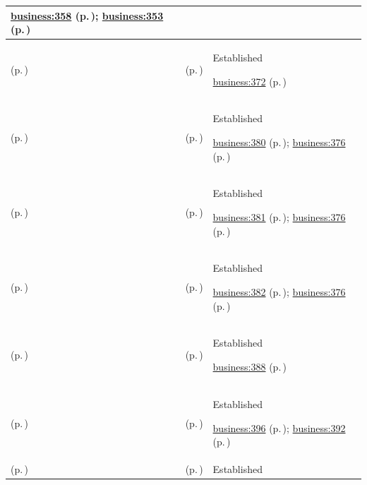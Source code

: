 \begin{longtable}{|>{\raggedright\arraybackslash}p{0.27\TableWidth}|>{\raggedright\arraybackslash}p{0.27\TableWidth}|>{\raggedright\arraybackslash}p{0.46\TableWidth}|}
 \hyperref[rad:business:355]{business:358} (p.\,\pageref{rad:business:355}); \hyperref[rad:business:353]{business:353} (p.\,\pageref{rad:business:353})\\\hline
\nameref{cap:bc-care-access-coordination} (p.\,\pageref{cap:bc-care-access-coordination}) & \nameref{cap:bc-care-access-management} (p.\,\pageref{cap:bc-care-access-management}) & Established

 \hyperref[rad:business:372]{business:372} (p.\,\pageref{rad:business:372})\\\hline
\nameref{cap:bc-care-access-management} (p.\,\pageref{cap:bc-care-access-management}) & \nameref{cap:bc-care-intake-management} (p.\,\pageref{cap:bc-care-intake-management}) & Established

 \hyperref[rad:business:378]{business:380} (p.\,\pageref{rad:business:378}); \hyperref[rad:business:376]{business:376} (p.\,\pageref{rad:business:376})\\\hline
\nameref{cap:bc-care-access-management} (p.\,\pageref{cap:bc-care-access-management}) & \nameref{cap:bc-care-referral-management} (p.\,\pageref{cap:bc-care-referral-management}) & Established

 \hyperref[rad:business:378]{business:381} (p.\,\pageref{rad:business:378}); \hyperref[rad:business:376]{business:376} (p.\,\pageref{rad:business:376})\\\hline
\nameref{cap:bc-care-access-management} (p.\,\pageref{cap:bc-care-access-management}) & \nameref{cap:bc-care-eligibility-determination} (p.\,\pageref{cap:bc-care-eligibility-determination}) & Established

 \hyperref[rad:business:378]{business:382} (p.\,\pageref{rad:business:378}); \hyperref[rad:business:376]{business:376} (p.\,\pageref{rad:business:376})\\\hline
\nameref{cap:bc-care-access-coordination} (p.\,\pageref{cap:bc-care-access-coordination}) & \nameref{cap:bc-care-scheduling-capacity-management} (p.\,\pageref{cap:bc-care-scheduling-capacity-management}) & Established

 \hyperref[rad:business:388]{business:388} (p.\,\pageref{rad:business:388})\\\hline
\nameref{cap:bc-care-scheduling-capacity-management} (p.\,\pageref{cap:bc-care-scheduling-capacity-management}) & \nameref{cap:bc-care-appointment-management} (p.\,\pageref{cap:bc-care-appointment-management}) & Established

 \hyperref[rad:business:394]{business:396} (p.\,\pageref{rad:business:394}); \hyperref[rad:business:392]{business:392} (p.\,\pageref{rad:business:392})\\\hline
\nameref{cap:bc-care-scheduling-capacity-management} (p.\,\pageref{cap:bc-care-scheduling-capacity-management}) & \nameref{cap:bc-care-place-allocation} (p.\,\pageref{cap:bc-care-place-allocation}) & Established


\end{longtable}
